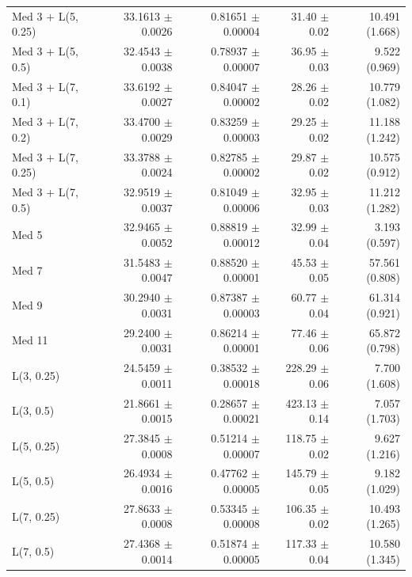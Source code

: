 \begin{longtable}{lrrrr}
Med 3 + L(5, 0.25) & 33.1613 $\pm$ 0.0026 & 0.81651 $\pm$ 0.00004 & 31.40 $\pm$ 0.02 & 10.491 (1.668) \\
Med 3 + L(5, 0.5) & 32.4543 $\pm$ 0.0038 & 0.78937 $\pm$ 0.00007 & 36.95 $\pm$ 0.03 & 9.522 (0.969) \\
Med 3 + L(7, 0.1) & 33.6192 $\pm$ 0.0027 & 0.84047 $\pm$ 0.00002 & 28.26 $\pm$ 0.02 & 10.779 (1.082) \\
Med 3 + L(7, 0.2) & 33.4700 $\pm$ 0.0029 & 0.83259 $\pm$ 0.00003 & 29.25 $\pm$ 0.02 & 11.188 (1.242) \\
Med 3 + L(7, 0.25) & 33.3788 $\pm$ 0.0024 & 0.82785 $\pm$ 0.00002 & 29.87 $\pm$ 0.02 & 10.575 (0.912) \\
Med 3 + L(7, 0.5) & 32.9519 $\pm$ 0.0037 & 0.81049 $\pm$ 0.00006 & 32.95 $\pm$ 0.03 & 11.212 (1.282) \\
Med 5 & 32.9465 $\pm$ 0.0052 & 0.88819 $\pm$ 0.00012 & 32.99 $\pm$ 0.04 & 3.193 (0.597) \\
Med 7 & 31.5483 $\pm$ 0.0047 & 0.88520 $\pm$ 0.00001 & 45.53 $\pm$ 0.05 & 57.561 (0.808) \\
Med 9 & 30.2940 $\pm$ 0.0031 & 0.87387 $\pm$ 0.00003 & 60.77 $\pm$ 0.04 & 61.314 (0.921) \\
Med 11 & 29.2400 $\pm$ 0.0031 & 0.86214 $\pm$ 0.00001 & 77.46 $\pm$ 0.06 & 65.872 (0.798) \\
L(3, 0.25) & 24.5459 $\pm$ 0.0011 & 0.38532 $\pm$ 0.00018 & 228.29 $\pm$ 0.06 & 7.700 (1.608) \\
L(3, 0.5) & 21.8661 $\pm$ 0.0015 & 0.28657 $\pm$ 0.00021 & 423.13 $\pm$ 0.14 & 7.057 (1.703) \\
L(5, 0.25) & 27.3845 $\pm$ 0.0008 & 0.51214 $\pm$ 0.00007 & 118.75 $\pm$ 0.02 & 9.627 (1.216) \\
L(5, 0.5) & 26.4934 $\pm$ 0.0016 & 0.47762 $\pm$ 0.00005 & 145.79 $\pm$ 0.05 & 9.182 (1.029) \\
L(7, 0.25) & 27.8633 $\pm$ 0.0008 & 0.53345 $\pm$ 0.00008 & 106.35 $\pm$ 0.02 & 10.493 (1.265) \\
L(7, 0.5) & 27.4368 $\pm$ 0.0014 & 0.51874 $\pm$ 0.00005 & 117.33 $\pm$ 0.04 & 10.580 (1.345) \\
\end{longtable}
\endgroup
